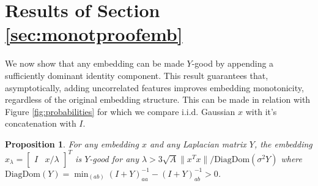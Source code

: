 \documentclass{article}
\newtheorem{proposition}{Proposition}
\begin{document}
\section{Results of Section \ref{sec:monotproofemb}}
\label{app:XproofI}

We now show that any embedding can be made $Y$-good by appending a sufficiently dominant identity component. This result guarantees that, asymptotically, adding uncorrelated features improves embedding monotonicity, regardless of the original embedding structure. This can be made in relation with Figure \ref{fig:probabilities} for which we compare i.i.d. Gaussian $x$ with it's concatenation with $I$.
\begin{proposition} \label{prop:assymptoticdelta}
    For any embedding $x$ and any Laplacian matrix $Y$, the embedding $x_\lambda = \begin{bmatrix}
        I &
        x / \lambda
    \end{bmatrix}^T$ is $Y$-good for any 
    $\lambda > 3 \sqrt{A} \| x^T x \| / \mathrm{DiagDom}(\sigma^2Y)$
    where $\mathrm{DiagDom}(Y) = \min_{(ab)} (I + Y)^{-1}_{aa} -  (I + Y)^{-1}_{ab} > 0$.
\end{proposition}
\end{document}
